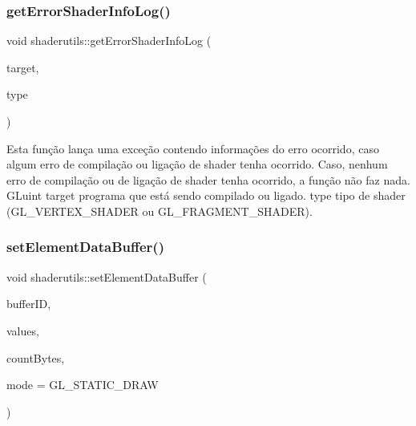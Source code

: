 \subsubsection{\texorpdfstring{get\+Error\+Shader\+Info\+Log()}{getErrorShaderInfoLog()}}
{\footnotesize\ttfamily void shaderutils\+::get\+Error\+Shader\+Info\+Log (\begin{DoxyParamCaption}\item[{G\+Luint}]{target,  }\item[{G\+Luint}]{type }\end{DoxyParamCaption})}

Esta função lança uma exceção contendo informações do erro ocorrido, caso algum erro de compilação ou ligação de shader tenha ocorrido. Caso, nenhum erro de compilação ou de ligação de shader tenha ocorrido, a função não faz nada.  G\+Luint target programa que está sendo compilado ou ligado.  type tipo de shader (G\+L\+\_\+\+V\+E\+R\+T\+E\+X\+\_\+\+S\+H\+A\+D\+ER ou G\+L\+\_\+\+F\+R\+A\+G\+M\+E\+N\+T\+\_\+\+S\+H\+A\+D\+ER). \mbox{\label{namespaceshaderutils_a3f248cb6d3c97c800044f60903334e0e}} 
\subsubsection{\texorpdfstring{set\+Element\+Data\+Buffer()}{setElementDataBuffer()}}
{\footnotesize\ttfamily void shaderutils\+::set\+Element\+Data\+Buffer (\begin{DoxyParamCaption}\item[{G\+Luint}]{buffer\+ID,  }\item[{G\+Luint $\ast$}]{values,  }\item[{G\+Luint}]{count\+Bytes,  }\item[{G\+Lenum}]{mode = {\ttfamily GL\+\_\+STATIC\+\_\+DRAW} }\end{DoxyParamCaption})}

